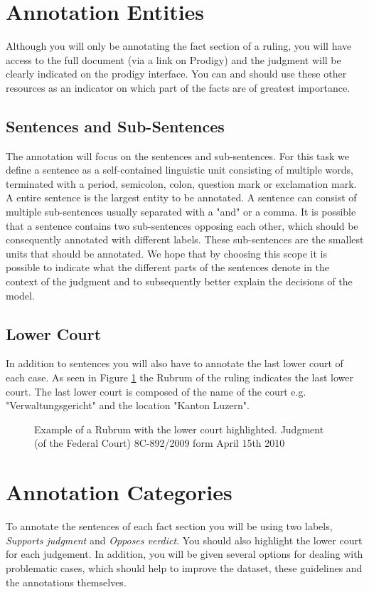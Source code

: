 \documentclass{article}
\begin{document}
\section{Annotation Entities}
Although you will only be annotating the fact section of a ruling, you will have access to the full document (via a link on Prodigy) and the judgment will be clearly indicated on the prodigy interface. You can and should use these other resources as an indicator on which part of the facts are of greatest importance.
\subsection{Sentences and Sub-Sentences}
The annotation will focus on the sentences and sub-sentences. For this task we define a sentence as a self-contained linguistic unit consisting of multiple words, terminated with a period, semicolon, colon, question mark or exclamation mark. A entire sentence is the largest entity to be annotated. A sentence can consist of multiple sub-sentences usually separated with a "and" or a comma. It is possible that a sentence contains two sub-sentences opposing each other, which should be consequently annotated with different labels. These sub-sentences are the smallest units that should be annotated. We hope that by choosing this scope it is possible to indicate what the different parts of the sentences denote in the context of the judgment and to subsequently better explain the decisions of the model.

\subsection{Lower Court}
In addition to sentences you will also have to annotate the last lower court of each case. As seen in Figure \ref{rubrum} the Rubrum of the ruling indicates the last lower court. The last lower court is composed of the name of the court e.g. "Verwaltungsgericht" and the location "Kanton Luzern".

\begin{figure}[h]
     \caption{Example of a Rubrum with the lower court highlighted.
     Judgment (of the Federal Court) 8C-892/2009 form April 15th 2010}
     \label{rubrum}
\end{figure}
\pagebreak

\section{Annotation Categories}
To annotate the sentences of each fact section you will be using two labels,  \emph{Supports judgment} and \emph{Opposes verdict}. You should also highlight the lower court for each judgement. In addition, you will be given several options for dealing with problematic cases, which should help to improve the dataset, these guidelines and the annotations themselves.
\end{document}
